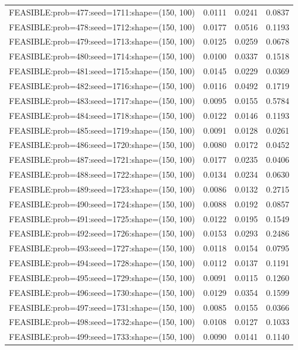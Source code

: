 \begin{longtable}{lccc}
FEASIBLE:prob=477:seed=1711:shape=(150, 100) & 0.0111 & 0.0241 & 0.0837 \\
FEASIBLE:prob=478:seed=1712:shape=(150, 100) & 0.0177 & 0.0516 & 0.1193 \\
FEASIBLE:prob=479:seed=1713:shape=(150, 100) & 0.0125 & 0.0259 & 0.0678 \\
FEASIBLE:prob=480:seed=1714:shape=(150, 100) & 0.0100 & 0.0337 & 0.1518 \\
FEASIBLE:prob=481:seed=1715:shape=(150, 100) & 0.0145 & 0.0229 & 0.0369 \\
FEASIBLE:prob=482:seed=1716:shape=(150, 100) & 0.0116 & 0.0492 & 0.1719 \\
FEASIBLE:prob=483:seed=1717:shape=(150, 100) & 0.0095 & 0.0155 & 0.5784 \\
FEASIBLE:prob=484:seed=1718:shape=(150, 100) & 0.0122 & 0.0146 & 0.1193 \\
FEASIBLE:prob=485:seed=1719:shape=(150, 100) & 0.0091 & 0.0128 & 0.0261 \\
FEASIBLE:prob=486:seed=1720:shape=(150, 100) & 0.0080 & 0.0172 & 0.0452 \\
FEASIBLE:prob=487:seed=1721:shape=(150, 100) & 0.0177 & 0.0235 & 0.0406 \\
FEASIBLE:prob=488:seed=1722:shape=(150, 100) & 0.0134 & 0.0234 & 0.0630 \\
FEASIBLE:prob=489:seed=1723:shape=(150, 100) & 0.0086 & 0.0132 & 0.2715 \\
FEASIBLE:prob=490:seed=1724:shape=(150, 100) & 0.0088 & 0.0192 & 0.0857 \\
FEASIBLE:prob=491:seed=1725:shape=(150, 100) & 0.0122 & 0.0195 & 0.1549 \\
FEASIBLE:prob=492:seed=1726:shape=(150, 100) & 0.0153 & 0.0293 & 0.2486 \\
FEASIBLE:prob=493:seed=1727:shape=(150, 100) & 0.0118 & 0.0154 & 0.0795 \\
FEASIBLE:prob=494:seed=1728:shape=(150, 100) & 0.0112 & 0.0137 & 0.1191 \\
FEASIBLE:prob=495:seed=1729:shape=(150, 100) & 0.0091 & 0.0115 & 0.1260 \\
FEASIBLE:prob=496:seed=1730:shape=(150, 100) & 0.0129 & 0.0354 & 0.1599 \\
FEASIBLE:prob=497:seed=1731:shape=(150, 100) & 0.0085 & 0.0155 & 0.0366 \\
FEASIBLE:prob=498:seed=1732:shape=(150, 100) & 0.0108 & 0.0127 & 0.1033 \\
FEASIBLE:prob=499:seed=1733:shape=(150, 100) & 0.0090 & 0.0141 & 0.1140 \\

\end{longtable}
